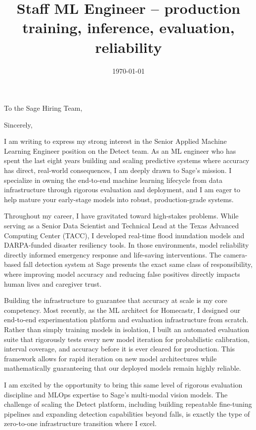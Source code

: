 \documentclass[letterpaper, 10pt,colorlinks,linkcolor=cyan]{moderncv}
\title{\large Staff ML Engineer -- production training, inference, evaluation, reliability}
\begin{document}
  \hypersetup{urlcolor=links}

  \date{\today}
  \opening{To the Sage Hiring Team,}
  \closing{Sincerely,}
  \makelettertitle

I am writing to express my strong interest in the Senior Applied Machine Learning Engineer position on the Detect team. As an ML engineer who has spent the last eight years building and scaling predictive systems where accuracy has direct, real-world consequences, I am deeply drawn to Sage's mission. I specialize in owning the end-to-end machine learning lifecycle from data infrastructure through rigorous evaluation and deployment, and I am eager to help mature your early-stage models into robust, production-grade systems.

Throughout my career, I have gravitated toward high-stakes problems. While serving as a Senior Data Scientist and Technical Lead at the Texas Advanced Computing Center (TACC), I developed real-time flood inundation models and DARPA-funded disaster resiliency tools. In those environments, model reliability directly informed emergency response and life-saving interventions. The camera-based fall detection system at Sage presents the exact same class of responsibility, where improving model accuracy and reducing false positives directly impacts human lives and caregiver trust.

Building the infrastructure to guarantee that accuracy at scale is my core competency. Most recently, as the ML architect for Homecastr, I designed our end-to-end experimentation platform and evaluation infrastructure from scratch. Rather than simply training models in isolation, I built an automated evaluation suite that rigorously tests every new model iteration for probabilistic calibration, interval coverage, and accuracy before it is ever cleared for production. This framework allows for rapid iteration on new model architectures while mathematically guaranteeing that our deployed models remain highly reliable. 

I am excited by the opportunity to bring this same level of rigorous evaluation discipline and MLOps expertise to Sage's multi-modal vision models. The challenge of scaling the Detect platform, including building repeatable fine-tuning pipelines and expanding detection capabilities beyond falls, is exactly the type of zero-to-one infrastructure transition where I excel. 
\end{document}
